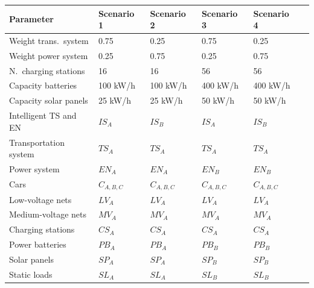 \begin{table}[h]
	\renewcommand{\arraystretch}{1.3}
	\label{tab:example1}
	\centering
	\begin{tabularx}{\columnwidth}{Xlllll}
		\hline
		\textbf{Parameter}                    & \textbf{Scenario 1}    & \textbf{Scenario 2} & \textbf{Scenario 3} & \textbf{Scenario 4}\\ \hline
		Weight trans.\ system 			& 0.75	      & 0.25  	& 0.75	& 0.25\\
		Weight power system 			& 0.25	      & 0.75  	& 0.25	& 0.75\\
		N.\ charging stations              & 16         & 16 		& 56	& 56\\
		Capacity batteries          & 100 kW/h         & 100 kW/h 		& 400 kW/h		& 400 kW/h\\
		Capacity solar panels               & 25 kW/h         & 25 kW/h 		& 50 kW/h		& 50 kW/h	\\ \hline
		Intelligent TS and EN                 & $IS_{A}$         & $IS_{B}$ 		& $IS_{A}$		& $IS_{B}$	\\ 
		Transportation system                 & $TS_{A}$         & $TS_{A}$ 		& $TS_{A}$		& $TS_{A}$	\\ 
		Power system                & $EN_{A}$         & $EN_{A}$ 		& $EN_{B}$		& $EN_{B}$	\\ 
		Cars                  & $C_{A,B,C}$          & $C_{A,B,C}$		& $C_{A,B,C}$		& $C_{A,B,C}$	\\ 
		Low-voltage nets                 & $LV_{A}$         & $LV_{A}$ 		& $LV_{A}$		& $LV_{A}$	\\ 
		Medium-voltage nets                 & $MV_{A}$         & $MV_{A}$ 		& $MV_{A}$		& $MV_{A}$	\\ 
		Charging stations                 & $CS_{A}$         & $CS_{A}$ 		& $CS_{A}$		& $CS_{A}$	\\ 
		Power batteries                & $PB_{A}$         & $PB_{A}$ 		& $PB_{B}$		& $PB_{B}$	\\ 
		Solar panels                 & $SP_{A}$         & $SP_{A}$ 		& $SP_{B}$		& $SP_{B}$	\\ 
		Static loads                 & $SL_{A}$         & $SL_{A}$ 		& $SL_{B}$		& $SL_{B}$	\\ \hline
	\end{tabularx}
\end{table}

